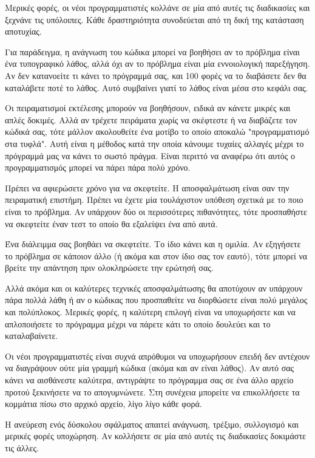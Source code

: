 \documentclass[10pt]{book}
\begin{document}
Μερικές φορές, οι νέοι προγραμματιστές κολλάνε σε μία από αυτές τις διαδικασίες 
και ξεχνάνε τις υπόλοιπες. Κάθε δραστηριότητα συνοδεύεται από τη δική της κατάσταση αποτυχίας.

Για παράδειγμα, η ανάγνωση του κώδικα μπορεί να βοηθήσει αν το πρόβλημα είναι ένα τυπογραφικό λάθος, αλλά όχι αν το πρόβλημα είναι μία εννοιολογική παρεξήγηση. Αν δεν κατανοείτε τι κάνει το πρόγραμμά σας, και 100 φορές να το διαβάσετε δεν θα καταλάβετε ποτέ το λάθος. Αυτό συμβαίνει γιατί το λάθος είναι μέσα στο κεφάλι σας.

Οι πειραματισμοί εκτέλεσης μπορούν να βοηθήσουν, ειδικά αν κάνετε μικρές και απλές δοκιμές. Αλλά αν τρέχετε πειράματα χωρίς να σκέφτεστε ή να διαβάζετε τον κώδικά σας, τότε μάλλον ακολουθείτε ένα μοτίβο το οποίο αποκαλώ  "προγραμματισμό στα τυφλά".  Αυτή είναι η μέθοδος κατά την οποία κάνουμε τυχαίες αλλαγές μέχρι το 
πρόγραμμά μας να κάνει το σωστό πράγμα. Είναι περιττό να αναφέρω ότι αυτός ο  προγραμματισμός μπορεί να πάρει πάρα πολύ χρόνο.

Πρέπει να αφιερώσετε χρόνο για να σκεφτείτε. Η αποσφαλμάτωση είναι σαν την πειραματική επιστήμη. Πρέπει να έχετε μία τουλάχιστον υπόθεση σχετικά με το ποιο είναι το πρόβλημα. Αν υπάρχουν δύο οι περισσότερες πιθανότητες, τότε προσπαθήστε να σκεφτείτε έναν τεστ το οποίο θα εξαλείψει ένα από αυτά.

Ένα διάλειμμα σας βοηθάει να σκεφτείτε. Το ίδιο κάνει και η ομιλία. Αν εξηγήσετε το πρόβλημα σε κάποιον άλλο (ή ακόμα και στον ίδιο σας τον εαυτό), τότε μπορεί να βρείτε την απάντηση πριν ολοκληρώσετε την ερώτησή σας.

Αλλά ακόμα και οι καλύτερες τεχνικές αποσφαλμάτωσης θα αποτύχουν αν υπάρχουν πάρα πολλά 
λάθη ή αν ο κώδικας που προσπαθείτε να διορθώσετε είναι πολύ μεγάλος και πολύπλοκος. Μερικές φορές, η καλύτερη επιλογή είναι να υποχωρήσετε και να απλοποιήσετε το πρόγραμμα μέχρι να πάρετε κάτι το οποίο δουλεύει και το καταλαβαίνετε.

Οι νέοι προγραμματιστές είναι συχνά απρόθυμοι να υποχωρήσουν επειδή δεν αντέχουν να 
διαγράψουν ούτε μία γραμμή κώδικα (ακόμα και αν είναι λάθος). Αν αυτό σας κάνει να αισθάνεστε καλύτερα, αντιγράψτε το πρόγραμμα σας σε ένα άλλο αρχείο προτού ξεκινήσετε να το απογυμνώνετε. Στη συνέχεια μπορείτε να επικολλήσετε τα κομμάτια πίσω στο αρχικό αρχείο, λίγο λίγο κάθε φορά.

Η ανεύρεση ενός δύσκολου σφάλματος απαιτεί ανάγνωση, τρέξιμο, συλλογισμό και μερικές φορές 
υποχώρηση. Αν κολλήσετε σε μία από αυτές τις διαδικασίες δοκιμάστε τις άλλες.
\end{document}
